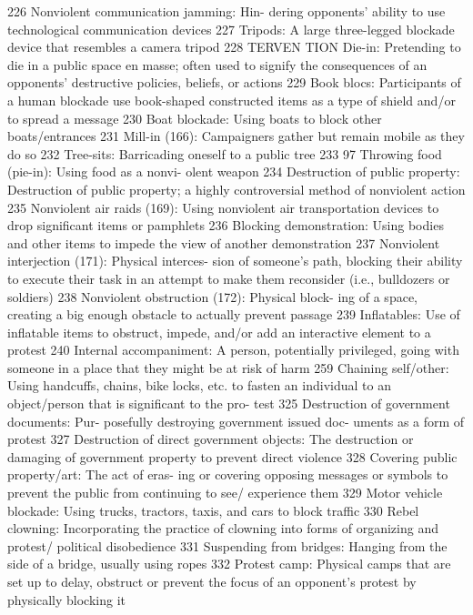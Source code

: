 \documentclass[twoside,a4paper,12pt,fleqn,openany]{extbook}
\begin{document}
 226
Nonviolent communication jamming: Hin-
dering opponents’ ability to use technological
communication devices
 227
Tripods: A large three-legged blockade device
that resembles a camera tripod
 228
TERVEN TION
Die-in: Pretending to die in a public space en
masse; often used to signify the consequences
of an opponents’ destructive policies, beliefs,
or actions
 229
Book blocs: Participants of a human blockade
use book-shaped constructed items as a type
of shield and/or to spread a message
 230
Boat blockade: Using boats to block other
boats/entrances
 231
Mill-in (166): Campaigners gather but remain
mobile as they do so
 232
Tree-sits: Barricading oneself to a public
tree
 233
97
Throwing food (pie-in): Using food as a nonvi-
olent weapon
 234
Destruction of public property: Destruction of
public property; a highly controversial method
of nonviolent action
 235
Nonviolent air raids (169): Using nonviolent air
transportation devices to drop significant items
or pamphlets
 236
Blocking demonstration: Using bodies and
other items to impede the view of another
demonstration
 237
Nonviolent interjection (171): Physical interces-
sion of someone’s path, blocking their ability to
execute their task in an attempt to make them
reconsider (i.e., bulldozers or soldiers)
 238
Nonviolent obstruction (172): Physical block-
ing of a space, creating a big enough obstacle
to actually prevent passage
 239
Inflatables: Use of inflatable items to obstruct,
impede, and/or add an interactive element to
a protest
 240
Internal accompaniment: A person, potentially
privileged, going with someone in a place that
they might be at risk of harm
 259
Chaining self/other: Using handcuffs, chains,
bike locks, etc. to fasten an individual to an
object/person that is significant to the pro-
test
 325
Destruction of government documents: Pur-
posefully destroying government issued doc-
uments as a form of protest
 327
Destruction of direct government objects:
The destruction or damaging of government
property to prevent direct violence
 328
Covering public property/art: The act of eras-
ing or covering opposing messages or symbols
to prevent the public from continuing to see/
experience them
 329
Motor vehicle blockade: Using trucks, tractors,
taxis, and cars to block traffic
 330
Rebel clowning: Incorporating the practice of
clowning into forms of organizing and protest/
political disobedience
 331
Suspending from bridges: Hanging from the
side of a bridge, usually using ropes
 332
Protest camp: Physical camps that are set up
to delay, obstruct or prevent the focus of an
opponent’s protest by physically blocking it
\end{document}
